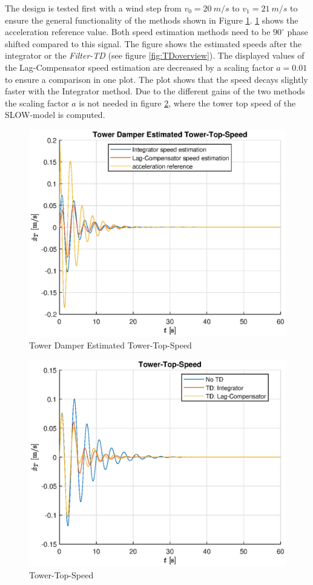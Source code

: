 The design is tested first with a wind step from $v_0 = \SI{20}{m/s}$ to $v_1 = \SI{21}{m/s}$ to ensure the general functionality of the methods shown in Figure \ref{fig:TDWindStepEst}. \ref{fig:TDWindStepEst} shows the acceleration reference value. Both speed estimation methods need to be $90^{\circ}$ phase shifted compared to this signal. The figure shows the estimated speeds after the integrator or the \textit{Filter-TD} (see figure \ref{fig:TDoverview}). The displayed values of the Lag-Compensator speed estimation are decreased by a scaling factor $a = 0.01$ to ensure a comparison in one plot. The plot shows that the speed decays slightly faster with the Integrator method. Due to the different gains of the two methods the scaling factor $a$ is not needed in figure \ref{fig:TDWindStep}, where the tower top speed of the SLOW-model is computed.
\begin{figure}[h]
	\centering	
	\includegraphics[width=12cm]{Figures/WindStepEst.eps}
	\caption{Tower Damper Estimated Tower-Top-Speed}
	\label{fig:TDWindStepEst}
\end{figure}
\begin{figure}[h]
	\centering	
	\includegraphics[width=12cm]{Figures/WindStep.eps}
	\caption{Tower-Top-Speed}
	\label{fig:TDWindStep}
\end{figure}
